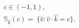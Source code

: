 \documentclass[preview]{standalone}
\begin{document}
\begin{align*}
c \in (-1,1), \
                    \\ \mathbb{S}_{\hat k}(c) =\
                    \{ \hat v : \hat v \cdot \hat k = c \}.
\end{align*}
\end{document}
